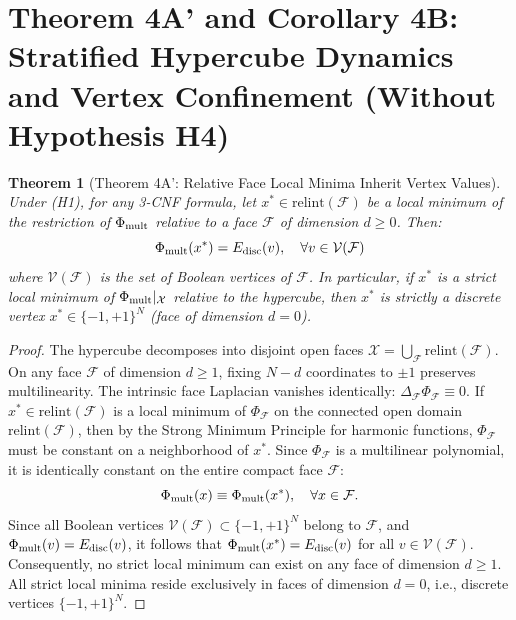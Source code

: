 \documentclass[11pt,a4paper]{article}
\newtheorem{theorem}{Theorem}[section]
\begin{document}
\section{Theorem 4A' and Corollary 4B: Stratified Hypercube Dynamics and Vertex Confinement (Without Hypothesis H4)}

\begin{theorem}[Theorem 4A': Relative Face Local Minima Inherit Vertex Values]
\label{thm:vertex_geom}
Under (H1), for any 3-CNF formula, let $x^* \in \text{relint}(\mathcal{F})$ be a local minimum of the restriction of $\Phi_{\rm mult}$ relative to a face $\mathcal{F}$ of dimension $d \ge 0$. Then:
\begin{equation}
\Phi_{\rm mult}(x^*) = E_{\rm disc}(v), \quad \forall v \in \mathcal{V}(\mathcal{F})
\end{equation}
where $\mathcal{V}(\mathcal{F})$ is the set of Boolean vertices of $\mathcal{F}$.
In particular, if $x^*$ is a strict local minimum of $\Phi_{\rm mult}|_{\mathcal{X}}$ relative to the hypercube, then $x^*$ is strictly a discrete vertex $x^* \in \{-1, +1\}^N$ (face of dimension $d=0$).
\end{theorem}

\begin{proof}
The hypercube decomposes into disjoint open faces $\mathcal{X} = \bigcup_{\mathcal{F}} \text{relint}(\mathcal{F})$.
On any face $\mathcal{F}$ of dimension $d \ge 1$, fixing $N-d$ coordinates to $\pm 1$ preserves multilinearity. The intrinsic face Laplacian vanishes identically: $\Delta_{\mathcal{F}} \Phi_{\mathcal{F}} \equiv 0$.
If $x^* \in \text{relint}(\mathcal{F})$ is a local minimum of $\Phi_{\mathcal{F}}$ on the connected open domain $\text{relint}(\mathcal{F})$, then by the Strong Minimum Principle for harmonic functions, $\Phi_{\mathcal{F}}$ must be constant on a neighborhood of $x^*$. Since $\Phi_{\mathcal{F}}$ is a multilinear polynomial, it is identically constant on the entire compact face $\mathcal{F}$:
\begin{equation}
\Phi_{\rm mult}(x) \equiv \Phi_{\rm mult}(x^*), \quad \forall x \in \mathcal{F}.
\end{equation}
Since all Boolean vertices $\mathcal{V}(\mathcal{F}) \subset \{-1, +1\}^N$ belong to $\mathcal{F}$, and $\Phi_{\rm mult}(v) = E_{\rm disc}(v)$, it follows that $\Phi_{\rm mult}(x^*) = E_{\rm disc}(v)$ for all $v \in \mathcal{V}(\mathcal{F})$.
Consequently, no strict local minimum can exist on any face of dimension $d \ge 1$. All strict local minima reside exclusively in faces of dimension $d=0$, i.e., discrete vertices $\{-1, +1\}^N$.
\end{proof}
\end{document}
